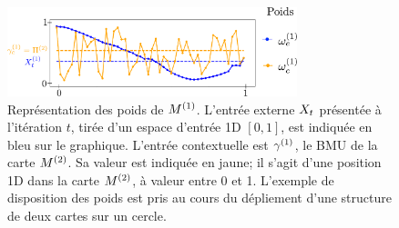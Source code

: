 \begin{figure}
\centering
\includegraphics[width=0.75\textwidth]{weights_2som.pdf}
\caption{Représentation des poids de $M^{({1})}$. L'entrée externe $X_t$ présentée à l'itération $t$, tirée d'un espace d'entrée 1D $[0,1]$, est indiquée en bleu sur le graphique. L'entrée contextuelle  est $\gamma^{({1})}$, le BMU de la carte $M^{({2})}$. Sa valeur est indiquée en jaune; il s'agit d'une position 1D dans la carte $M^{({2})}$, à valeur entre 0 et 1. L'exemple de disposition des poids est pris au cours du dépliement d'une structure de deux cartes sur un cercle. \label{fig:2som_weights}}
\end{figure}

